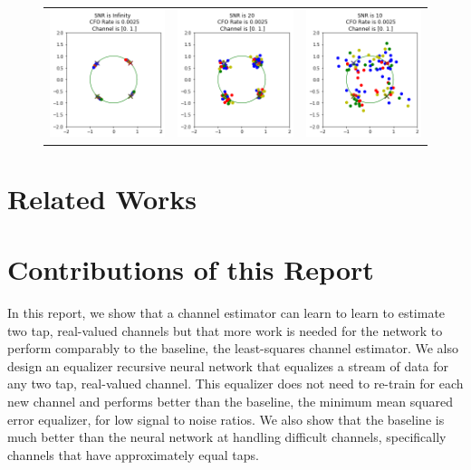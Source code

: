\begin{figure}
\begin{tabular}{ccc}
    \includegraphics[width=45mm]{figures/cfo_equal_intro/snr_0_c5/cfo_0.png}&
    \includegraphics[width=45mm]{figures/cfo_equal_intro/snr_20_c5/cfo_0.png}&
    \includegraphics[width=45mm]{figures/cfo_equal_intro/snr_10_c5/cfo_0.png}\\
  \end{tabular}
  \label{fig:multi_tap_cfo}
\end{figure}

\section{Related Works}



\section{Contributions of this Report}

In this report, we show that a channel estimator can learn to learn to estimate two tap, real-valued channels but that more work is needed for the network to perform comparably to the baseline, the least-squares channel estimator.
We also design an equalizer recursive neural network that equalizes a stream of data for any two tap, real-valued channel. This equalizer does not need to re-train for each new channel and performs better than the baseline, the minimum mean squared error equalizer, for low signal to noise ratios.  We also show that the baseline is much better than the neural network at handling difficult channels, specifically channels that have approximately equal taps.

